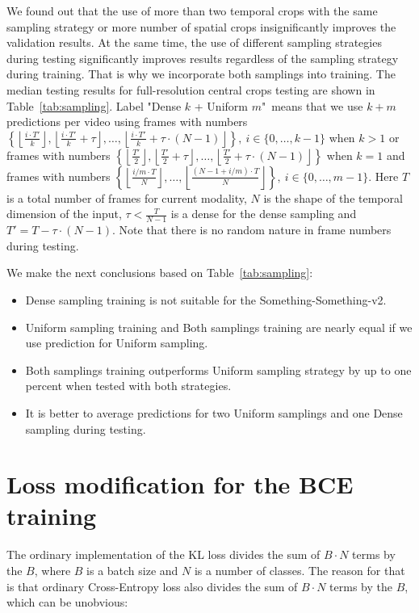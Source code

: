 \documentclass[conference]{IEEEtran}
\begin{document}
We found out that the use of more than two temporal crops with the same sampling strategy or more number of spatial crops insignificantly improves the validation results. At the same time, the use of different sampling strategies during testing significantly improves results regardless of the sampling strategy during training. That is why we incorporate both samplings into training. The median testing results for full-resolution central crops testing are shown in Table~\ref{tab:sampling}.
Label "Dense $k$ + Uniform $m$"\ means that we use $k+m$ predictions per video using frames with numbers $\left\{\left\lfloor\frac{i\cdot T'}{k}\right\rfloor,\left\lfloor\frac{i\cdot T'}{k}+\tau\right\rfloor,\ldots,\left\lfloor\frac{i\cdot T'}{k}+\tau\cdot(N-1)\right\rfloor\right\},\ i\in\{0,\ldots,k-1\}$ when $k>1$ or frames with numbers $\left\{\left\lfloor\frac{ T'}{2}\right\rfloor,\left\lfloor\frac{ T'}{2}+\tau\right\rfloor,\ldots,\left\lfloor\frac{ T'}{2}+\tau\cdot(N-1)\right\rfloor\right\}$ when $k=1$ and frames with numbers $\left\{\left\lfloor\frac{i/m\cdot T}{N}\right\rfloor,\ldots,\left\lfloor\frac{(N-1+i/m)\cdot T}{N}\right\rfloor\right\},\ i\in\{0,\ldots,m-1\}$. Here $T$ is a total number of frames for current modality, $N$ is the shape of the temporal dimension of the input, $\tau < \frac{T}{N-1}$ is a dense for the dense sampling and $T'=T-\tau\cdot(N-1)$. Note that there is no random nature in frame numbers during testing.

We make the next conclusions based on Table~\ref{tab:sampling}:
\begin{itemize}
	\item Dense sampling training is not suitable for the Something-Something-v2.
	\item Uniform sampling training and Both samplings training are nearly equal if we use prediction for Uniform sampling.
	\item Both samplings training outperforms Uniform sampling strategy by up to one percent when tested with both strategies.
	\item It is better to average predictions for two Uniform samplings and one Dense sampling during testing.
\end{itemize}

\section{Loss modification for the BCE training} \label{app:c}

The ordinary implementation of the KL loss divides the sum of $B\cdot N$ terms by the $B$, where $B$ is a batch size and $N$ is a number of classes. The reason for that is that ordinary Cross-Entropy loss also divides the sum of $B\cdot N$ terms by the $B$, which can be unobvious:
\end{document}

